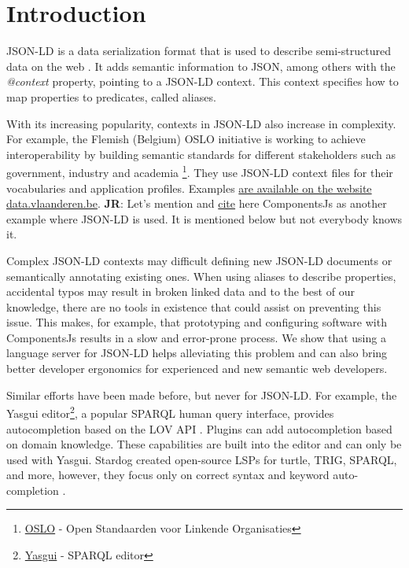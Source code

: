 \documentclass[
]{ceurart}
\newcommand\jr[1]{{\color{Red}\textbf{JR}: #1}}
\begin{document}
\maketitle

\section{Introduction}

JSON-LD is a data serialization format that is used to describe semi-structured data on the web \cite{JSON-LD-W3C}.
It adds semantic information to JSON, among others with the \textit{@context} property, pointing to a JSON-LD context.
This context specifies how to map properties to predicates, called aliases.

With its increasing popularity, contexts in JSON-LD also increase in complexity.
For example, the Flemish (Belgium) OSLO initiative is working to achieve interoperability by building semantic standards for different stakeholders such as government, industry and academia \footnote{\href{https://www.vlaanderen.be/digitaal-vlaanderen/onze-oplossingen/oslo}{OSLO} - Open Standaarden voor Linkende Organisaties}.
They use JSON-LD context files for their vocabularies and application profiles. Examples \href{https://data.vlaanderen.be}{are available on the website data.vlaanderen.be}.
\jr{Let's mention and \href{https://www.semantic-web-journal.net/content/componentsjs-semantic-dependency-injection-0}{cite} here ComponentsJs as another example where JSON-LD is used. It is mentioned below but not everybody knows it.}

Complex JSON-LD contexts may difficult defining new JSON-LD documents or semantically annotating existing ones. 
When using aliases to describe properties, accidental typos may result in broken linked data and to the best of our knowledge, there are no tools in existence that could assist on preventing this issue.
This makes, for example, that prototyping and configuring software with ComponentsJs results in a slow and error-prone process.
We show that using a language server for JSON-LD helps alleviating this problem and can also bring better developer ergonomics for experienced and new semantic web developers.

Similar efforts have been made before, but never for JSON-LD. For example, the Yasgui editor\footnote{\href{https://triply.cc/docs/yasgui/}{Yasgui} - SPARQL editor}, a popular SPARQL human query interface, provides autocompletion based on the LOV API \cite{LOV}. Plugins can add autocompletion based on domain knowledge. These capabilities are built into the editor and can only be used with Yasgui.
Stardog created open-source LSPs for turtle, TRIG, SPARQL, and more, however, they focus only on correct syntax and keyword auto-completion \cite{stardog}. 
\end{document}
